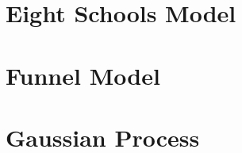 \documentclass{article}
\begin{document}
\section{Eight Schools Model}



\section{Funnel Model}



\section{Gaussian Process}


\end{document}
